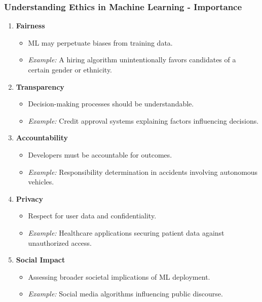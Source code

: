 \documentclass[aspectratio=169]{beamer}
\begin{document}
\begin{frame}[fragile]
    \frametitle{Understanding Ethics in Machine Learning - Importance}
    \begin{enumerate}
        \item \textbf{Fairness}
            \begin{itemize}
                \item ML may perpetuate biases from training data.
                \item \textit{Example:} A hiring algorithm unintentionally favors candidates of a certain gender or ethnicity.
            \end{itemize}
        
        \item \textbf{Transparency}
            \begin{itemize}
                \item Decision-making processes should be understandable.
                \item \textit{Example:} Credit approval systems explaining factors influencing decisions.
            \end{itemize}

        \item \textbf{Accountability}
            \begin{itemize}
                \item Developers must be accountable for outcomes.
                \item \textit{Example:} Responsibility determination in accidents involving autonomous vehicles.
            \end{itemize}

        \item \textbf{Privacy}
            \begin{itemize}
                \item Respect for user data and confidentiality.
                \item \textit{Example:} Healthcare applications securing patient data against unauthorized access.
            \end{itemize}

        \item \textbf{Social Impact}
            \begin{itemize}
                \item Assessing broader societal implications of ML deployment.
                \item \textit{Example:} Social media algorithms influencing public discourse.
            \end{itemize}
    \end{enumerate}
\end{frame}
\end{document}
